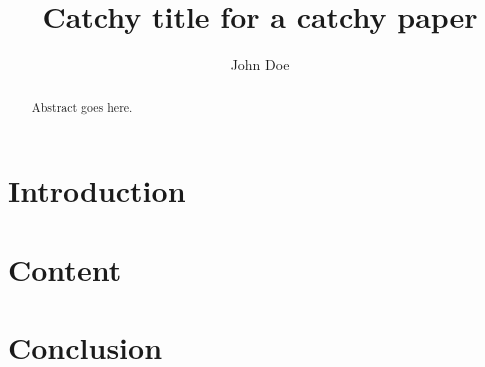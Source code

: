 \documentclass[a4paper,twocolumn]{article}
\begin{document}
\title{Catchy title for a catchy paper}

\author{John Doe}

\maketitle

\begin{abstract}
    Abstract goes here. 
\end{abstract}




\section{Introduction}
\label{sec:intro}

\section{Content}
\label{sec:content}

\section{Conclusion}
\label{sec:conclusion}


\end{document}
